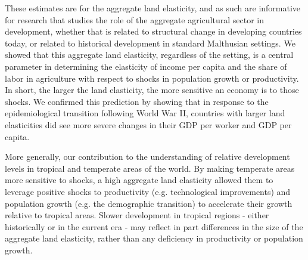 \documentclass[11pt]{article}
\begin{document}
These estimates are for the aggregate land elasticity, and as such are informative for research that studies the role of the aggregate agricultural sector in development, whether that is related to structural change in developing countries today, or related to historical development in standard Malthusian settings. We showed that this aggregate land elasticity, regardless of the setting, is a central parameter in determining the elasticity of income per capita and the share of labor in agriculture with respect to shocks in population growth or productivity. In short, the larger the land elasticity, the more sensitive an economy is to those shocks. We confirmed this prediction by showing that in response to the epidemiological transition following World War II, countries with larger land elasticities did see more severe changes in their GDP per worker and GDP per capita.

More generally, our contribution to the understanding of relative development levels in tropical and temperate areas of the world. By making temperate areas more sensitive to shocks, a high aggregate land elasticity allowed them to leverage positive shocks to productivity (e.g. technological improvements) and population growth (e.g. the demographic transition) to accelerate their growth relative to tropical areas. Slower development in tropical regions - either historically or in the current era - may reflect in part differences in the size of the aggregate land elasticity, rather than any deficiency in productivity or population growth. 

\newpage

\clearpage

\onehalfspacing
{\small


}

\clearpage
\end{document}
